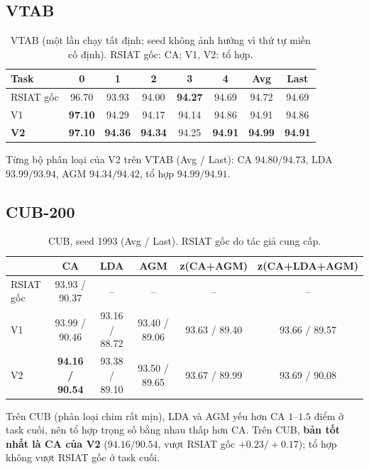 \documentclass[11pt]{article}
\begin{document}
\subsection{VTAB}
\begin{table}[H]
\centering\small
\caption{VTAB (một lần chạy tất định; seed không ảnh hưởng vì thứ tự miền cố định). RSIAT gốc: CA; V1, V2: tổ hợp.}
\begin{tabular}{l*{5}{c}cc}
\toprule
Task & 0 & 1 & 2 & 3 & 4 & Avg & Last \\
\midrule
RSIAT gốc & 96.70 & 93.93 & 94.00 & \textbf{94.27} & 94.69 & 94.72 & 94.69 \\
V1 & \textbf{97.10} & 94.29 & 94.17 & 94.14 & 94.86 & 94.91 & 94.86 \\
\textbf{V2} & \textbf{97.10} & \textbf{94.36} & \textbf{94.34} & 94.25 & \textbf{94.91} & \textbf{94.99} & \textbf{94.91} \\
\bottomrule
\end{tabular}
\end{table}
Từng bộ phân loại của V2 trên VTAB (Avg / Last): CA $94.80/94.73$, LDA $93.99/93.94$, AGM $94.34/94.42$, tổ hợp
$94.99/94.91$.

\subsection{CUB-200}
\begin{table}[H]
\centering\small
\caption{CUB, seed 1993 (Avg / Last). RSIAT gốc do tác giả cung cấp.}
\label{tab:cub}
\begin{tabular}{lccccc}
\toprule
 & CA & LDA & AGM & z(CA+AGM) & z(CA+LDA+AGM) \\
\midrule
RSIAT gốc & 93.93 / 90.37 & -- & -- & -- & -- \\
V1 & 93.99 / 90.46 & 93.16 / 88.72 & 93.40 / 89.06 & 93.63 / 89.40 & 93.66 / 89.57 \\
V2 & \textbf{94.16 / 90.54} & 93.38 / 89.10 & 93.50 / 89.65 & 93.67 / 89.99 & 93.69 / 90.08 \\
\bottomrule
\end{tabular}
\end{table}
Trên CUB (phân loại chim rất mịn), LDA và AGM yếu hơn CA $1$--$1.5$ điểm ở task cuối, nên tổ hợp trọng số bằng nhau thấp
hơn CA. Trên CUB, \textbf{bản tốt nhất là CA của V2} ($94.16/90.54$, vượt RSIAT gốc $+0.23/+0.17$); tổ hợp không vượt
RSIAT gốc ở task cuối.
\end{document}
